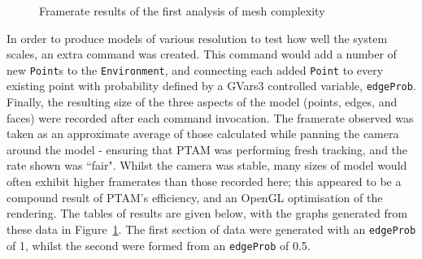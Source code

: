 \documentclass[a4paper,10pt]{article}
\begin{document}
\begin{figure}
  \begin{center}
    \hspace{10px}
  \end{center}
  \caption{Framerate results of the first analysis of mesh complexity}
  \label{framerate}
\end{figure} 

In order to produce models of various resolution to test how well the system scales, an extra command was created. This command would add a number of new \texttt{Point}s to the \texttt{Environment}, and connecting each added \texttt{Point} to every existing point with probability defined by a GVars3 controlled variable, \texttt{edgeProb}. Finally, the resulting size of the three aspects of the model (points, edges, and faces) were recorded after each command invocation. The framerate observed was taken as an approximate average of those calculated while panning the camera around the model - ensuring that PTAM was performing fresh tracking, and the rate shown was ``fair". Whilst the camera was stable, many sizes of model would often exhibit higher framerates than those recorded here; this appeared to be a compound result of PTAM's efficiency, and an OpenGL optimisation of the rendering. The tables of results are given below, with the graphs generated from these data in Figure~\ref{framerate}. The first section of data were generated with an \texttt{edgeProb} of 1, whilst the second were formed from an \texttt{edgeProb} of 0.5.
\end{document}
